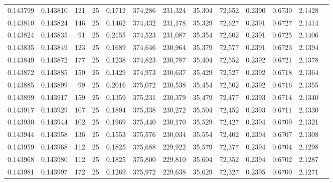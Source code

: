 \begin{tabular}{rrrrrrrrrrrrr}
0.143799 & 0.143810 &   121 &  25 &                                     0.1712 & 374,286 & 231,324 &  35,304 &  72,652 & 0.2390 & 0.6730 & 2.1428 \\
0.143810 & 0.143824 &   146 &  25 &                                     0.1462 & 374,432 & 231,178 &  35,329 &  72,627 & 0.2391 & 0.6727 & 2.1414 \\
0.143824 & 0.143835 &    91 &  25 &                                     0.2155 & 374,523 & 231,087 &  35,354 &  72,602 & 0.2391 & 0.6725 & 2.1406 \\
0.143835 & 0.143849 &   123 &  25 &                                     0.1689 & 374,646 & 230,964 &  35,379 &  72,577 & 0.2391 & 0.6723 & 2.1394 \\
0.143849 & 0.143872 &   177 &  25 &                                     0.1238 & 374,823 & 230,787 &  35,404 &  72,552 & 0.2392 & 0.6721 & 2.1378 \\
0.143872 & 0.143885 &   150 &  25 &                                     0.1429 & 374,973 & 230,637 &  35,429 &  72,527 & 0.2392 & 0.6718 & 2.1364 \\
0.143885 & 0.143899 &    99 &  25 &                                     0.2016 & 375,072 & 230,538 &  35,454 &  72,502 & 0.2392 & 0.6716 & 2.1355 \\
0.143899 & 0.143917 &   159 &  25 &                                     0.1359 & 375,231 & 230,379 &  35,479 &  72,477 & 0.2393 & 0.6714 & 2.1340 \\
0.143917 & 0.143929 &   107 &  25 &                                     0.1894 & 375,338 & 230,272 &  35,504 &  72,452 & 0.2393 & 0.6711 & 2.1330 \\
0.143930 & 0.143944 &   102 &  25 &                                     0.1969 & 375,440 & 230,170 &  35,529 &  72,427 & 0.2394 & 0.6709 & 2.1321 \\
0.143944 & 0.143958 &   136 &  25 &                                     0.1553 & 375,576 & 230,034 &  35,554 &  72,402 & 0.2394 & 0.6707 & 2.1308 \\
0.143959 & 0.143968 &   112 &  25 &                                     0.1825 & 375,688 & 229,922 &  35,579 &  72,377 & 0.2394 & 0.6704 & 2.1298 \\
0.143968 & 0.143980 &   112 &  25 &                                     0.1825 & 375,800 & 229,810 &  35,604 &  72,352 & 0.2394 & 0.6702 & 2.1287 \\
0.143981 & 0.143997 &   172 &  25 &                                     0.1269 & 375,972 & 229,638 &  35,629 &  72,327 & 0.2395 & 0.6700 & 2.1271 \\

\end{tabular}
